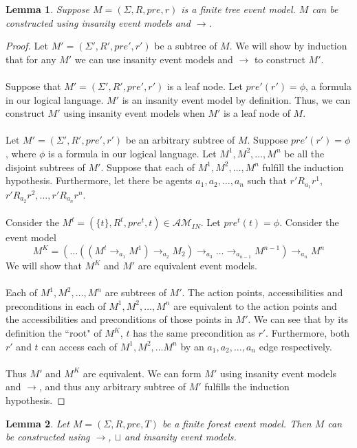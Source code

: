 \documentclass[12pt, a4paper, titlepage]{article}
\newtheorem{lemma}{Lemma}[subsection]
\numberwithin{equation}{section}
\newcommand{\eventClass}{\mathcal{AM}}
\newcommand{\insaneClass}{\eventClass_{IN}}
\begin{document}
\begin{lemma} \label{finTreeConstruct}
Suppose $M = (\Sigma, R, pre, r)$ is a finite tree event model.
$M$ can be constructed using insanity event models and $\to$.
\end{lemma}
\begin{proof}
Let $M' = (\Sigma', R', pre', r')$ be a subtree of $M$.
We will show by induction that for any $M'$ we can use insanity event models and $\to$ to
construct $M'$.\\
\\
Suppose that $M' = (\Sigma', R', pre', r')$ is a leaf node.
Let $pre'(r') = \phi$, a formula in our logical language.
$M'$ is an insanity event model by definition.
Thus, we can construct $M'$ using insanity event models when $M'$ is a leaf node of $M$.\\
\\
Let $M' = (\Sigma', R', pre', r')$ be an arbitrary subtree of $M$.
Suppose $pre'(r') = \phi$, where $\phi$ is a formula in our logical language.
Let $M^1, M^2, \ldots, M^n$ be all the disjoint subtrees of $M'$.
Suppose that each of $M^1, M^2, \ldots, M^n$ fulfill the induction hypothesis.
Furthermore, let there be agents $a_1, a_2, \ldots, a_n$ such that $r' R_{a_1} r^1$, $r' R_{a_2} r^2,
	\ldots, r' R_{a_n} r^n$.\\
\\
Consider the $M^t = (\{ t \}, R^t, pre^t, t) \in \insaneClass$.
Let $pre^t(t) = \phi$.
Consider the event model 
\[
M^K = (\ldots((M^t \to_{a_1} M ^ 1) \to_{a_2} M_2) \to_{a_3} \ldots
\to_{a_{n-1}} M^{n-1} ) \to_{a_n} M ^ n
\]
We will show that $M^K$ and $M'$ are equivalent event models.\\
\\
Each of $M^1, M^2, \ldots, M^n$ are subtrees of $M'$.
The action points, accessibilities and preconditions in each of $M^1, M^2, \ldots, M^n$ are
equivalent to the action points and the accessibilities and preconditions of those points in $M'$.
We can see that by its definition the ``root" of $M^K$, $t$ has the same precondition as $r'$.
Furthermore, both $r'$ and $t$ can access each of $M^1, M^2, \ldots M^n$ by an $a_1, a_2, \ldots, a_n$ edge
respectively.\\
\\
Thus $M'$ and $M^K$ are equivalent.
We can form $M'$ using insanity event models and $\to$, and thus any arbitrary subtree of $M'$
fulfills the induction hypothesis.
\end{proof}

\begin{lemma} \label{forestCon}
Let $M = (\Sigma, R, pre, T)$ be a finite forest event model.
Then $M$ can be constructed using $\to$, $\sqcup$ and insanity event models.
\end{lemma}
\end{document}
